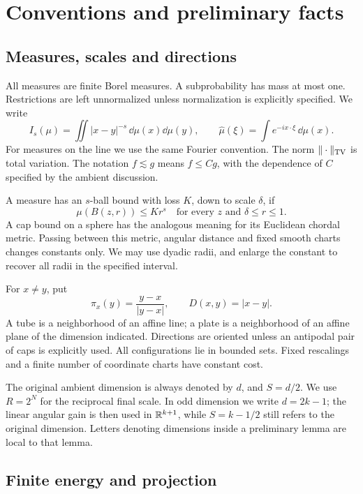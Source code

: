 \section{Conventions and preliminary facts}\label{sec:conventions}

\subsection{Measures, scales and directions}

All measures are finite Borel measures. A subprobability has mass at most
one. Restrictions are left unnormalized unless normalization is explicitly
specified. We write
\[
 I_s(\mu)=\iint |x-y|^{-s}\,\dd\mu(x)\dd\mu(y),
 \qquad
 \widehat\mu(\xi)=\int e^{-i x\cdot\xi}\,\dd\mu(x).
\]
For measures on the line we use the same Fourier convention.
The norm \(\|\cdot\|_{\mathrm{TV}}\) is total variation.
The notation \(f\lesssim g\) means \(f\le Cg\), with the dependence of \(C\)
specified by the ambient discussion.

A measure has an \(s\)-ball bound with loss \(K\), down to scale
\(\delta\), if
\[
 \mu(B(z,r))\le K r^s
 \quad\text{for every }z\text{ and }\delta\le r\le1.
\]
A cap bound on a sphere has the analogous meaning for its Euclidean
chordal metric. Passing between this metric, angular distance and fixed
smooth charts changes constants only. We may use dyadic radii, and enlarge
the constant to recover all radii in the specified interval.

For \(x\ne y\), put
\[
 \pi_x(y)=\frac{y-x}{|y-x|},\qquad D(x,y)=|x-y|.
\]
A tube is a neighborhood of an affine line; a plate is a neighborhood
of an affine plane of the dimension indicated. Directions are oriented
unless an antipodal pair of caps is explicitly used.
All configurations lie in bounded sets. Fixed rescalings and a finite
number of coordinate charts have constant cost.

The original ambient dimension is always denoted by \(d\), and
\(S=d/2\). We use \(R=2^N\) for the reciprocal final scale.
In odd dimension we write \(d=2k-1\); the linear angular gain is then used
in \(\mathbb R^{k+1}\), while \(S=k-1/2\) still refers to the original dimension.
Letters denoting dimensions inside a preliminary lemma are local to that
lemma.

\subsection{Finite energy and projection}

